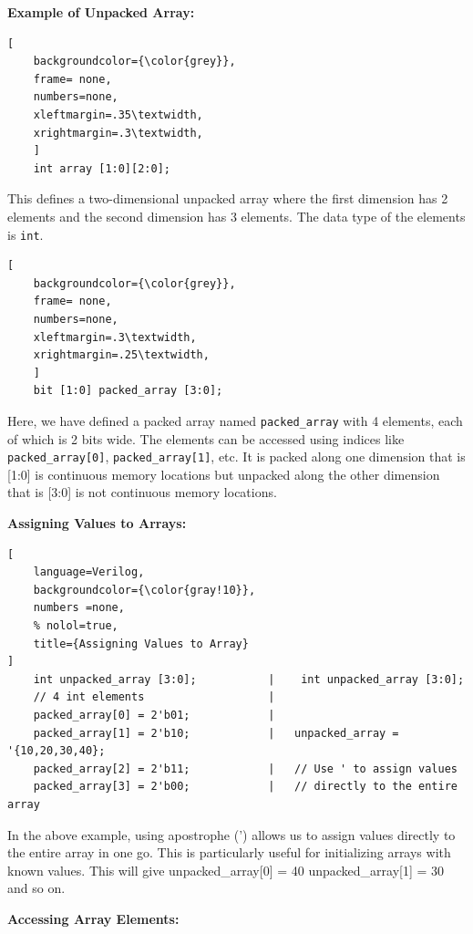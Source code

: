 \documentclass[12pt, a4paper]{article}
\begin{document}
\vspace{1em}

\textbf{Example of Unpacked Array:}
\begin{lstlisting}[
    backgroundcolor={\color{grey}},
    frame= none,
    numbers=none,
    xleftmargin=.35\textwidth,
    xrightmargin=.3\textwidth, 
    ]
    int array [1:0][2:0]; 
\end{lstlisting}

This defines a two-dimensional unpacked array where the first dimension has 2 elements and the second dimension has 3 elements. The data type of the elements is \texttt{int}.

\begin{lstlisting}[
    backgroundcolor={\color{grey}},
    frame= none,
    numbers=none,
    xleftmargin=.3\textwidth,
    xrightmargin=.25\textwidth, 
    ]
    bit [1:0] packed_array [3:0];
\end{lstlisting}

Here, we have defined a packed array named \texttt{packed\_array} with 4 elements, each of which is 2 bits wide. The elements can be accessed using indices like \texttt{packed\_array[0]}, \texttt{packed\_array[1]}, etc. It is packed along one dimension that is [1:0] is continuous memory locations but unpacked along the other dimension that is [3:0] is not continuous memory locations.

\textbf{Assigning Values to Arrays:}
\begin{lstlisting}[
    language=Verilog,
    backgroundcolor={\color{gray!10}},
    numbers =none,
    % nolol=true,
    title={Assigning Values to Array}
]
    int unpacked_array [3:0];           |    int unpacked_array [3:0];
    // 4 int elements                   |
    packed_array[0] = 2'b01;            |
    packed_array[1] = 2'b10;            |   unpacked_array = '{10,20,30,40};
    packed_array[2] = 2'b11;            |   // Use ' to assign values 
    packed_array[3] = 2'b00;            |   // directly to the entire array
\end{lstlisting}


In the above example, using apostrophe (') allows us to assign values directly to the entire array in one go. This is particularly useful for initializing arrays with known values. This will give unpacked\_array[0] = 40 unpacked\_array[1] = 30 and so on.

\vspace{1em}

\textbf{Accessing Array Elements:}
\end{document}
